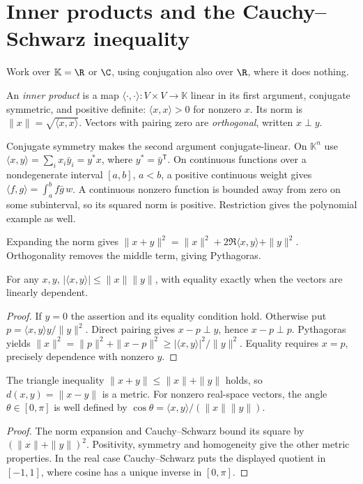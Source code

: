\section{Inner products and the Cauchy--Schwarz inequality}

Work over $\mathbb K=\R$ or $\C$, using conjugation also over $\R$, where it does nothing.
\begin{definition}\label{linear:def:inner}
An \emph{inner product} is a map $\langle\cdot,\cdot\rangle:V\times V\to\mathbb K$ linear in its first argument, conjugate symmetric, and positive definite: $\langle x,x\rangle>0$ for nonzero $x$. Its norm is $\|x\|=\sqrt{\langle x,x\rangle}$. Vectors with pairing zero are \emph{orthogonal}, written $x\perp y$.
\end{definition}

Conjugate symmetry makes the second argument conjugate-linear. On $\mathbb K^n$ use $\langle x,y\rangle=\sum_ix_i\bar y_i=y^*x$, where $y^*=\bar y^{\mathsf T}$. On continuous functions over a nondegenerate interval $[a,b]$, $a<b$, a positive continuous weight gives $\langle f,g\rangle=\int_a^bf\bar g\,w$. A continuous nonzero function is bounded away from zero on some subinterval, so its squared norm is positive. Restriction gives the polynomial example as well.

Expanding the norm gives $\|x+y\|^2=\|x\|^2+2\Re\langle x,y\rangle+\|y\|^2$. Orthogonality removes the middle term, giving Pythagoras.

\begin{theorem}\label{linear:thm:cs}
For any $x,y$, $|\langle x,y\rangle|\le\|x\|\|y\|$, with equality exactly when the vectors are linearly dependent.
\end{theorem}
\begin{proof}
If $y=0$ the assertion and its equality condition hold. Otherwise put $p=\langle x,y\rangle y/\|y\|^2$. Direct pairing gives $x-p\perp y$, hence $x-p\perp p$. Pythagoras yields $\|x\|^2=\|p\|^2+\|x-p\|^2\ge|\langle x,y\rangle|^2/\|y\|^2$. Equality requires $x=p$, precisely dependence with nonzero $y$.
\end{proof}

\begin{corollary}\label{linear:cor:triangle}
The triangle inequality $\|x+y\|\le\|x\|+\|y\|$ holds, so $d(x,y)=\|x-y\|$ is a metric. For nonzero real-space vectors, the angle $\theta\in[0,\pi]$ is well defined by $\cos\theta=\langle x,y\rangle/(\|x\|\|y\|)$.
\end{corollary}
\begin{proof}
The norm expansion and Cauchy--Schwarz bound its square by $(\|x\|+\|y\|)^2$. Positivity, symmetry and homogeneity give the other metric properties. In the real case Cauchy--Schwarz puts the displayed quotient in $[-1,1]$, where cosine has a unique inverse in $[0,\pi]$.
\end{proof}

